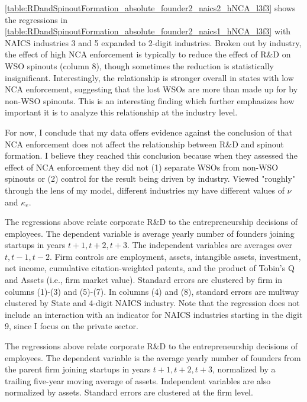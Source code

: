 \documentclass[11pt,english]{article}
\begin{document}
\autoref{table:RDandSpinoutFormation_absolute_founder2_naics2_hNCA_l3f3} shows the regressions in \autoref{table:RDandSpinoutFormation_absolute_founder2_naics1_hNCA_l3f3} with NAICS industries 3 and 5 expanded to 2-digit industries. Broken out by industry, the effect of high NCA enforcement is typically to reduce the effect of R\&D on WSO spinouts (column 8), though sometimes the reduction is statistically insignificant. Interestingly, the relationship is stronger overall in states with low NCA enforcement, suggesting that the lost WSOs are more than made up for by non-WSO spinouts. This is an interesting finding which further emphasizes how important it is to analyze this relationship at the industry level. 

For now, I conclude that my data offers evidence against the conclusion of \cite{babina_entrepreneurial_2019} that NCA enforcement does not affect the relationship between R\&D and spinout formation. I believe they reached this conclusion because when they assessed the effect of NCA enforcement they did not (1) separate WSOs from non-WSO spinouts or (2) control for the result being driven by industry. Viewed "roughly" through the lens of my model, different industries my have different values of $\nu$ and $\kappa_e$. 



\begin{table}[!htb]
	\scriptsize
	\centering
	
	\caption{The regressions above relate corporate R\&D to the entrepreneurship decisions of employees. The dependent variable is average yearly number of founders joining startups in years $t+1,t+2,t+3$. The independent variables are averages over $t,t-1,t-2$. Firm controls are employment, assets, intangible assets, investment, net income, cumulative citation-weighted patents, and the product of Tobin's Q and Assets (i.e., firm market value). Standard errors are clustered by firm in columns (1)-(3) and (5)-(7). In columns (4) and (8), standard errors are multway clustered by State and 4-digit NAICS industry. Note that the regression does not include an interaction with an indicator for NAICS industries starting in the digit 9, since I focus on the private sector.}
	\label{table:RDandSpinoutFormation_absolute_founder2_l3f3}
\end{table}

\begin{table}[!htb]
	\scriptsize
	\centering
	
	\caption{The regressions above relate corporate R\&D to the entrepreneurship decisions of employees. The dependent variable is the average yearly number of founders from the parent firm joining startups in years $t+1,t+2,t+3$, normalized by a trailing five-year moving average of assets. Independent variables are also normalized by assets. Standard errors are clustered at the firm level.}
	\label{table:RDandSpinoutFormation_at_founder2_l3f3}
\end{table}
\end{document}
